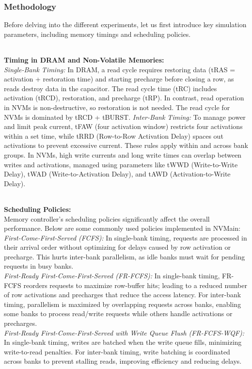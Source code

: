 \subsubsection{Methodology}
\label{subsec:nvm-dram-methods}
Before delving into the different experiments,  let us first introduce key simulation parameters, including memory timings and scheduling policies.

~\\\noindent \textbf{Timing in DRAM and Non-Volatile Memories:}\\
\textit{Single-Bank Timing:}
In DRAM, a read cycle requires restoring data (tRAS = activation + restoration time) and starting precharge before closing a row, as reads destroy data in the capacitor. The read cycle time (tRC) includes activation (tRCD), restoration, and precharge (tRP). In contrast, read operation in NVMs is non-destructive, so restoration is not needed. The read cycle for NVMs is dominated by tRCD + tBURST. 
\textit{Inter-Bank Timing:} To manage power and limit peak current, tFAW (four activation window) restricts four activations within a set time, while tRRD (Row-to-Row Activation Delay) spaces out activations to prevent excessive current. These rules apply within and across bank groups. In NVMs, high write currents and long write times can overlap between writes and activations, managed using parameters like tWWD (Write-to-Write Delay), tWAD (Write-to-Activation Delay), and tAWD (Activation-to-Write Delay).


~\\\noindent \textbf{Scheduling Policies:}\\
Memory controller's scheduling policies significantly affect the overall performance. Below are some commonly used policies implemented in NVMain:\\
\textit{First-Come-First-Served (FCFS):}
In single-bank timing, requests are processed in their arrival order without optimizing for delays caused by row activation or precharge. This hurts inter-bank parallelism, as idle banks must wait for pending requests in busy banks.\\
\textit{First-Ready First-Come-First-Served (FR-FCFS):}
In single-bank timing, FR-FCFS reorders requests to maximize row-buffer hits; leading to a reduced number of row activations and precharges that reduce the access latency. For inter-bank timing, parallelism is maximized by overlapping requests across banks, enabling some banks to process read/write requests while others handle activations or precharges.\\
\textit{First-Ready First-Come-First-Served with Write Queue Flush (FR-FCFS-WQF):}
In single-bank timing, writes are batched when the write queue fills, minimizing write-to-read penalties. For inter-bank timing, write batching is coordinated across banks to prevent stalling reads, improving efficiency and reducing delays.




